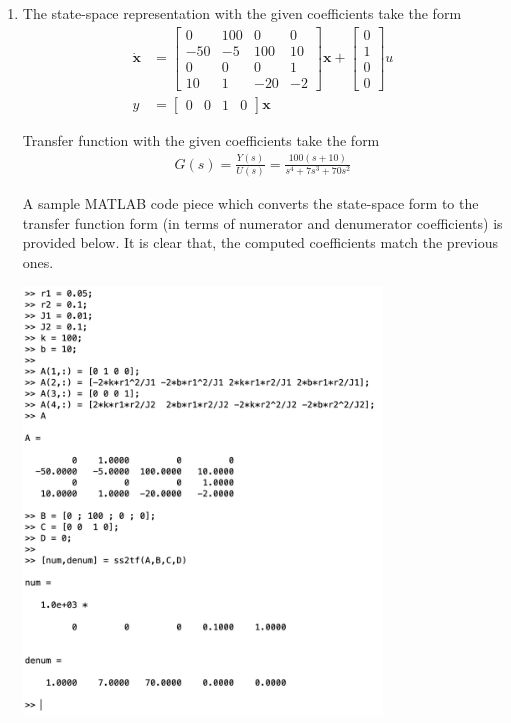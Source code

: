 \documentclass[twoside]{article}
\theoremstyle{definition}
\begin{document}
\begin{enumerate}
\item The state-space representation with the given coefficients take the form
%
 \begin{align*}
\dot{\mathbf{x}} &= \left[ \begin{array}{cccc} 0 & 100 & 0 & 0 \\
-50 & -5 & 100 & 10
\\
0 & 0 & 0 & 1 \\
10 & 1 & -20 & -2
\end{array} \right] \mathbf{x} +
                   \left[ \begin{array}{c} 0 \\ 1 \\ 0 \\
                            0 \end{array} \right] u
\\
y &= \left[ \begin{array}{cccc} 0 & 0 & 1 & 0 \end{array} \right] \mathbf{x} 
\end{align*}

Transfer function with the given coefficients take the form
%
 \begin{align*}
 G(s) = \frac{Y(s)}{U(s)} = \frac{100 (s + 10)}{s^4 + 7 s^3 + 70 s^2}
 \end{align*}
 
A sample MATLAB code piece which converts the state-space form to the transfer function form
(in terms of numerator and denumerator coefficients) is provided below. It is clear that, the computed
coefficients match the previous ones. 
 
     \vspace{12pt}
    
\begin{minipage}[h]{1\linewidth}
    \begin{center}
      \includegraphics[width=0.75\textwidth]{matlabver}
    \end{center}
\end{minipage}

\end{enumerate}
\end{document}
